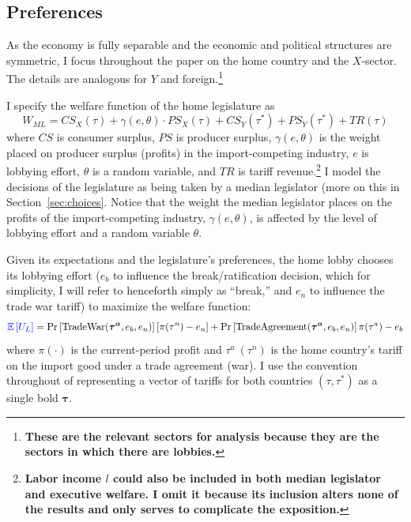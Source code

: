 \documentclass[10pt]{article}
\newcommand{\ve}{\theta}
\newcommand{\ta}{\theta}
\newcommand{\expect}{\mathbb{E}}
\newcommand{\bta}{\bm{\tau^a}}
\newcommand{\ga}{\gamma}
\begin{document}
\subsection{Preferences}
\label{sec:pref}
As the economy is fully separable and the economic and political structures are symmetric, I focus throughout the paper on the home country and the $X$-sector. The details are analogous for $Y$ and foreign.\footnote{\textbf{These are the relevant sectors for analysis because they are the sectors in which there are lobbies.}}

I specify the welfare function of the home legislature as
\begin{equation}
  W_{\mathit{ML}} = \mathit{CS}_X(\tau) + \ga(e,\ve) \cdot \mathit{PS}_X(\tau) + \mathit{CS}_Y(\tau^*) + \mathit{PS}_Y(\tau^*) + \mathit{TR}(\tau)
  \label{eq:ml}
\end{equation}
where $\mathit{CS}$ is consumer surplus, $\mathit{PS}$ is producer surplus, $\ga(e,\ta)$ is the weight placed on producer surplus (profits) in the import-competing industry, $e$ is lobbying effort, $\ta$ is a random variable, and $\mathit{TR}$ is tariff revenue.\footnote{\textbf{Labor income $l$ could also be included in both median legislator and executive welfare. I omit it because its inclusion alters none of the results and only serves to complicate the exposition.}} I model the decisions of the legislature as being taken by a median legislator (more on this in Section~\ref{sec:choices}. Notice that the weight the median legislator places on the profits of the import-competing industry, $\ga(e,\ve)$, is affected by the level of lobbying effort and a random variable $\ta$. 

Given its expectations and the legislature's preferences, the home lobby chooses its lobbying effort ($e_b$ to influence the break/ratification decision, which for simplicity, I will refer to henceforth simply as ``break,'' and $e_n$ to influence the trade war tariff) to maximize the welfare function:
\begin{equation}
  {\color{blue} \expect \left[U_L \right]} = \Pr\left[ \text{TradeWar}(\bta,e_b,e_n) \right] \left[ \pi(\tau^{\mathit{n}}) - e_n \right] + \Pr\left[ \text{TradeAgreement}(\bta,e_b,e_n) \right] \pi(\tau^a) - e_b
  \label{eq:lv}
\end{equation}
where $\pi(\cdot)$ is the current-period profit and $\tau^a \ (\tau^\mathit{n})$ is the home country's tariff on the import good under a trade agreement (war). I use the convention throughout of representing a vector of tariffs for both countries $(\tau,\tau^*)$ as a single bold $\bm{\tau}$. 
\end{document}

